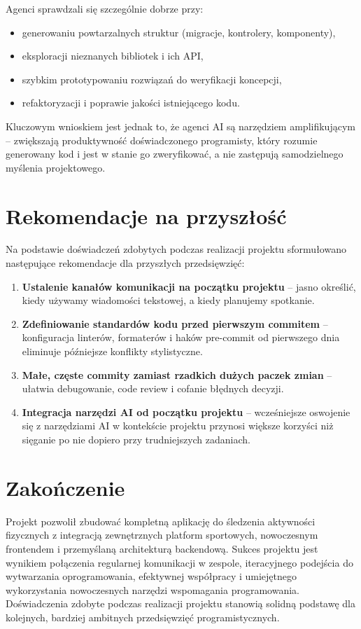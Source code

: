 \documentclass[12pt,a4paper]{report}
\begin{document}
Agenci sprawdzali się szczególnie dobrze przy:
\begin{itemize}[noitemsep]
    \item generowaniu powtarzalnych struktur (migracje, kontrolery, komponenty),
    \item eksploracji nieznanych bibliotek i ich API,
    \item szybkim prototypowaniu rozwiązań do weryfikacji koncepcji,
    \item refaktoryzacji i poprawie jakości istniejącego kodu.
\end{itemize}

Kluczowym wnioskiem jest jednak to, że agenci AI są narzędziem amplifikującym -- zwiększają produktywność doświadczonego programisty, który rozumie generowany kod i jest w stanie go zweryfikować, a nie zastępują samodzielnego myślenia projektowego.

\section{Rekomendacje na przyszłość}

Na podstawie doświadczeń zdobytych podczas realizacji projektu sformułowano następujące rekomendacje dla przyszłych przedsięwzięć:

\begin{enumerate}
    \item \textbf{Ustalenie kanałów komunikacji na początku projektu} -- jasno określić, kiedy używamy wiadomości tekstowej, a kiedy planujemy spotkanie.
    \item \textbf{Zdefiniowanie standardów kodu przed pierwszym commitem} -- konfiguracja linterów, formaterów i haków pre-commit od pierwszego dnia eliminuje późniejsze konflikty stylistyczne.
    \item \textbf{Małe, częste commity zamiast rzadkich dużych paczek zmian} -- ułatwia debugowanie, code review i cofanie błędnych decyzji.
    \item \textbf{Integracja narzędzi AI od początku projektu} -- wcześniejsze oswojenie się z narzędziami AI w kontekście projektu przynosi większe korzyści niż sięganie po nie dopiero przy trudniejszych zadaniach.
\end{enumerate}

\section{Zakończenie}

Projekt pozwolił zbudować kompletną aplikację do śledzenia aktywności fizycznych z integracją zewnętrznych platform sportowych, nowoczesnym frontendem i przemyślaną architekturą backendową. Sukces projektu jest wynikiem połączenia regularnej komunikacji w zespole, iteracyjnego podejścia do wytwarzania oprogramowania, efektywnej współpracy i umiejętnego wykorzystania nowoczesnych narzędzi wspomagania programowania. Doświadczenia zdobyte podczas realizacji projektu stanowią solidną podstawę dla kolejnych, bardziej ambitnych przedsięwzięć programistycznych.

\end{document}
